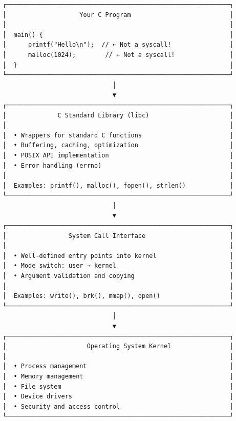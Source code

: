 \begin{verbatim}
┌─────────────────────────────────────────────────────────────┐
│                    Your C Program                           │
│                                                             │
│  main() {                                                   │
│      printf("Hello\n");  // ← Not a syscall!                │
│      malloc(1024);        // ← Not a syscall!               │
│  }                                                          │
└─────────────────────────────────────────────────────────────┘
                              │
                              ▼
┌─────────────────────────────────────────────────────────────┐
│              C Standard Library (libc)                      │
│                                                             │
│  • Wrappers for standard C functions                        │
│  • Buffering, caching, optimization                         │
│  • POSIX API implementation                                 │
│  • Error handling (errno)                                   │
│                                                             │
│  Examples: printf(), malloc(), fopen(), strlen()            │
└─────────────────────────────────────────────────────────────┘
                              │
                              ▼
┌─────────────────────────────────────────────────────────────┐
│                 System Call Interface                       │
│                                                             │
│  • Well-defined entry points into kernel                    │
│  • Mode switch: user → kernel                               │
│  • Argument validation and copying                          │
│                                                             │
│  Examples: write(), brk(), mmap(), open()                   │
└─────────────────────────────────────────────────────────────┘
                              │
                              ▼
┌─────────────────────────────────────────────────────────────┐
│                      Operating System Kernel                │
│                                                             │
│  • Process management                                       │
│  • Memory management                                        │
│  • File system                                              │
│  • Device drivers                                           │
│  • Security and access control                              │
└─────────────────────────────────────────────────────────────┘
\end{verbatim}

